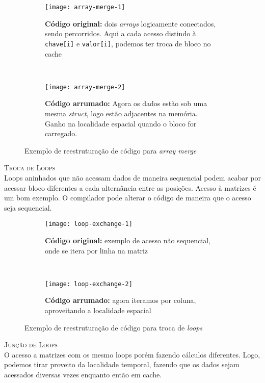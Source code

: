 \begin{figure*}[ht]
  \begin{subfigure}[t]{.5\textwidth}
    \centering
    \texttt{[image: array-merge-1]}
    \caption{\textbf{Código original:} dois \textit{arrays} logicamente conectados, sendo percorridos. Aqui a cada acesso distindo à \texttt{chave{[i]}} e \texttt{valor{[i]}}, podemos ter troca de bloco no cache}
  \end{subfigure}
  ~
  \begin{subfigure}[t]{.5\textwidth}
    \centering
    \texttt{[image: array-merge-2]}
    \caption{\textbf{Código arrumado:} Agora os dados estão sob uma mesma \textit{struct}, logo estão adjacentes na memória. Ganho na localidade espacial quando o bloco for carregado.}
  \end{subfigure}

  \caption{Exemplo de reestruturação de código para \textit{array merge}}
  \label{figs:array-merge}
\end{figure*}




\textsc{Troca de Loops}\\
Loops aninhados que não acessam dados de maneira sequencial podem acabar por acessar bloco diferentes a cada alternância entre as posições. Acesso à matrizes é um bom exemplo. O compilador pode alterar o código de maneira que o acesso seja sequencial.

\begin{figure*}[ht]
  \begin{subfigure}[t]{.5\textwidth}
    \centering
    \texttt{[image: loop-exchange-1]}
    \caption{\textbf{Código original:} exemplo de acesso não sequencial, onde se itera por linha na matriz}
  \end{subfigure}
  ~
  \begin{subfigure}[t]{.5\textwidth}
    \centering
    \texttt{[image: loop-exchange-2]}
    \caption{\textbf{Código arrumado:} agora iteramos por coluna, aproveitando a localidade espacial}
  \end{subfigure}

  \caption{Exemplo de reestruturação de código para troca de \textit{loops}}
  \label{figs:loop-exchange}
\end{figure*}



\textsc{Junção de Loops}\\
O acesso a matrizes com os mesmo loops porém fazendo cálculos diferentes. Logo, podemos tirar proveito da localidade temporal, fazendo que os dados sejam acessados diversas vezes enquanto então em cache.

